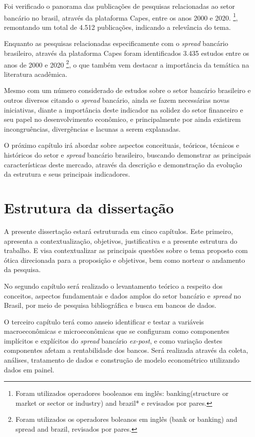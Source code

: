 \documentclass[12pt,12pt,openright,oneside,a4paper,chapter=TITLE,section=TITLE,subsection=TITLE,subsubsection=TITLE english,french,spanish,portugues,sumario=tradicional]{abntex2}
\begin{document}
Foi verificado o panorama das publicações de pesquisas relacionadas ao setor bancário no brasil, através da plataforma Capes, entre os anos 2000 e 2020.
\footnote{Foram utilizados operadores booleanos em inglês: banking(structure or
market or sector or industry) and brazil* e revisados por pares.}, remontando um total de 4.512 publicações, indicando a relevância do tema.

Enquanto as pesquisas relacionadas especificamente com o \emph{spread} bancário brasileiro, através da plataforma Capes foram identificados 3.435 estudos entre os anos de 2000 e 2020 \footnote{Foram utilizados os operadores boleanos em
inglês (bank or banking) and spread and brazil, revisados por pares.}, o que também vem destacar a importância da temática na literatura acadêmica.

Mesmo com um número considerado de estudos sobre o setor bancário brasileiro e outros diversos citando o \emph{spread} bancário, ainda se fazem necessárias novas iniciativas, diante a importância deste indicador na solidez do setor financeiro e seu papel no desenvolvimento econômico, e principalmente por ainda existirem incongruências, divergências e lacunas a serem explanadas.

O próximo capítulo irá abordar sobre aspectos conceituais, teóricos, técnicos e históricos do setor e \emph{spread} bancário brasileiro, buscando demonstrar as principais características deste mercado, através da descrição e demonstração da evolução da estrutura e seus principais indicadores.

\section{Estrutura da dissertação}

A presente dissertação estará estruturada em cinco capítulos. Este primeiro, apresenta a contextualização, objetivos, justificativa e a presente estrutura do trabalho. E visa contextualizar as principais questões sobre o tema proposto com ótica direcionada para a proposição e objetivos, bem como nortear o andamento da pesquisa.

No segundo capítulo será realizado o levantamento teórico a respeito dos conceitos, aspectos fundamentais e dados amplos do setor bancário e \emph{spread} no Brasil, por meio de pesquisa bibliográfica e busca em bancos de dados.

O terceiro capítulo terá como anseio identificar e testar a variáveis macroeconômicas e microeconômicas que se configuram como componentes implícitos e explícitos do \emph{spread} bancário \emph{ex-post}, e como variação destes componentes afetam a rentabilidade dos bancos. Será realizada através da coleta, análises, tratamento de dados e construção de modelo econométrico utilizando dados em painel.
\end{document}
